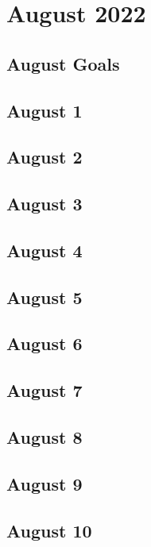 \chapter{August 2022}

\section*{August Goals}

\section{August 1}

\section{August 2}

\section{August 3}

\section{August 4}

\section{August 5}

\section{August 6}

\section{August 7}

\section{August 8}

\section{August 9}

\section{August 10}

